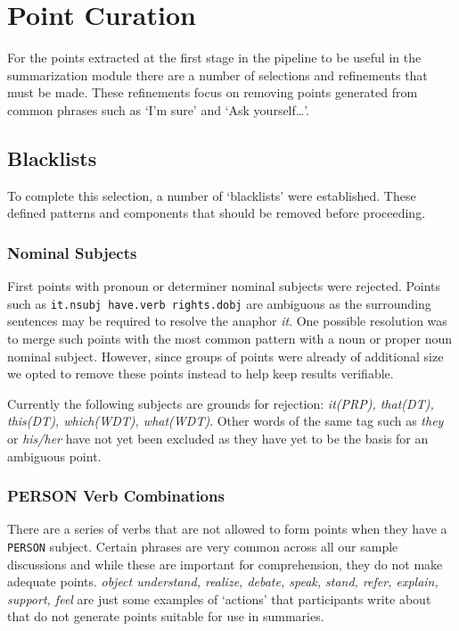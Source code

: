 \chapter{Point Curation\label{chap:point-curation}}
  For the points extracted at the first stage in the pipeline to be useful in the summarization module there are a number of selections and refinements that must be made. These refinements focus on removing points generated from common phrases such as `I'm sure' and `Ask yourself\dots'.

  \section{Blacklists}
    To complete this selection, a number of `blacklists' were established. These defined patterns and components that should be removed before proceeding.
    \subsection{Nominal Subjects}
      First points with pronoun or determiner nominal subjects were rejected. Points such as \texttt{it.nsubj have.verb rights.dobj} are ambiguous as the surrounding sentences may be required to resolve the anaphor \textit{it}. One possible resolution was to merge such points with the most common pattern with a noun or proper noun nominal subject. However, since groups of points were already of additional size we opted to remove these points instead to help keep results verifiable.

      Currently the following subjects are grounds for rejection: \textit{it(PRP), that(DT), this(DT), which(WDT), what(WDT)}. Other words of the same tag such as \textit{they} or \textit{his/her} have not yet been excluded as they have yet to be the basis for an ambiguous point.

    \subsection{PERSON Verb Combinations}
      There are a series of verbs that are not allowed to form points when they have a \texttt{PERSON} subject. Certain phrases are very common across all our sample discussions and while these are important for comprehension, they do not make adequate points. \textit{object understand, realize, debate, speak, stand, refer, explain, support, feel} are just some examples of `actions' that participants write about that do not generate points suitable for use in summaries.

